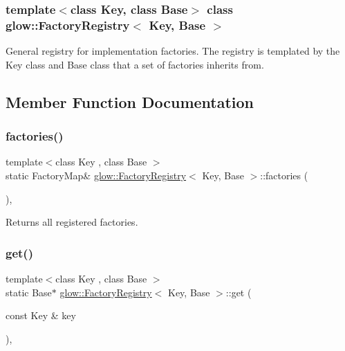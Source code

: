 \subsubsection*{template$<$class Key, class Base$>$\newline
class glow\+::\+Factory\+Registry$<$ Key, Base $>$}

General registry for implementation factories. The registry is templated by the Key class and Base class that a set of factories inherits from. 

\subsection{Member Function Documentation}
\mbox{\label{classglow_1_1_factory_registry_a9f52e9f03175b729d272d8587ad9c259}} 
\subsubsection{\texorpdfstring{factories()}{factories()}}
{\footnotesize\ttfamily template$<$class Key , class Base $>$ \\
static Factory\+Map\& \hyperlink{classglow_1_1_factory_registry}{glow\+::\+Factory\+Registry}$<$ Key, Base $>$\+::factories (\begin{DoxyParamCaption}{ }\end{DoxyParamCaption})\hspace{0.3cm}{\ttfamily [inline]}, {\ttfamily [static]}}

\begin{DoxyReturn}{Returns}
all registered factories. 
\end{DoxyReturn}
\mbox{\label{classglow_1_1_factory_registry_a47327249d018b64fdba09cc525e338ca}} 
\subsubsection{\texorpdfstring{get()}{get()}}
{\footnotesize\ttfamily template$<$class Key , class Base $>$ \\
static Base$\ast$ \hyperlink{classglow_1_1_factory_registry}{glow\+::\+Factory\+Registry}$<$ Key, Base $>$\+::get (\begin{DoxyParamCaption}\item[{const Key \&}]{key }\end{DoxyParamCaption})\hspace{0.3cm}{\ttfamily [inline]}, {\ttfamily [static]}}

